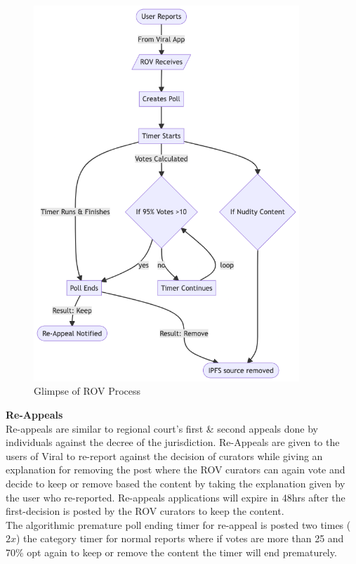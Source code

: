 \documentclass[10pt]{article}
\begin{document}
\begin{figure}[H]
\begin{center}
\includegraphics[width=10cm]{rov-poll}
\caption{Glimpse of ROV Process}
\end{center}
\end{figure}

\textbf{Re-Appeals}\\

Re-appeals are similar to regional court's first \& second appeals done by individuals against the decree of the jurisdiction.  Re-Appeals are given to the users of Viral to re-report against the decision of curators while giving an explanation for removing the post where the ROV curators can again vote and decide to keep or remove based the content by taking the explanation given by the user who re-reported. Re-appeals applications will expire in 48hrs after the first-decision is posted by the ROV curators to keep the content. \\

The algorithmic premature poll ending timer for re-appeal is posted two times ($2x$) the category timer for normal reports where if votes are more than 25 and 70\% opt again to keep or remove the content the timer will end prematurely.\\
\end{document}
